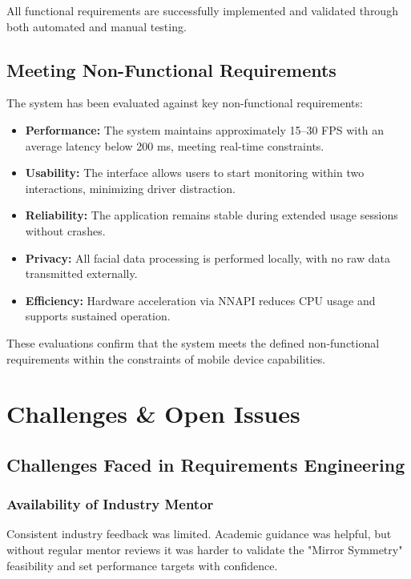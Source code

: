\documentclass[11pt]{report}
\begin{document}
All functional requirements are successfully implemented and validated through both automated and manual testing.

\section{Meeting Non-Functional Requirements} %

The system has been evaluated against key non-functional requirements:

\begin{itemize}
    \item \textbf{Performance:} The system maintains approximately 15--30 FPS with an average latency below 200 ms, meeting real-time constraints.

    \item \textbf{Usability:} The interface allows users to start monitoring within two interactions, minimizing driver distraction.

    \item \textbf{Reliability:} The application remains stable during extended usage sessions without crashes.

    \item \textbf{Privacy:} All facial data processing is performed locally, with no raw data transmitted externally.

    \item \textbf{Efficiency:} Hardware acceleration via NNAPI reduces CPU usage and supports sustained operation.
\end{itemize}

These evaluations confirm that the system meets the defined non-functional requirements within the constraints of mobile device capabilities.

\chapter{Challenges \& Open Issues}

\section{Challenges Faced in Requirements Engineering}

\subsection{Availability of Industry Mentor}
Consistent industry feedback was limited. Academic guidance was helpful, but without regular mentor reviews it was harder to validate the "Mirror Symmetry" feasibility and set performance targets with confidence.
\end{document}

